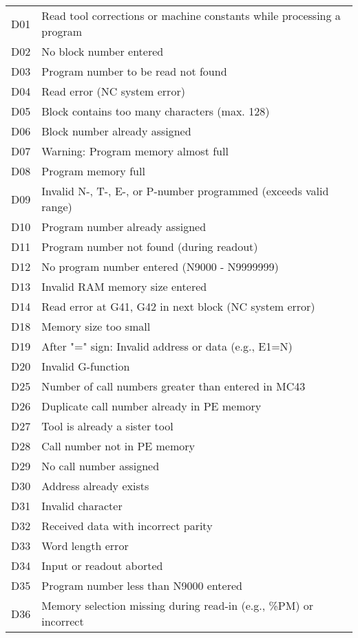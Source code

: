\documentclass[openany,11pt]{book}
\begin{document}
\begin{table}[!h]
    \begin{tabular}{ll}
    D01 & Read tool corrections or machine constants while processing a program \\
    D02 & No block number entered \\
    D03 & Program number to be read not found \\
    D04 & Read error (NC system error) \\
    D05 & Block contains too many characters (max. 128) \\
    D06 & Block number already assigned \\
    D07 & Warning: Program memory almost full \\
    D08 & Program memory full \\
    D09 & Invalid N-, T-, E-, or P-number programmed (exceeds valid range) \\
    D10 & Program number already assigned \\
    D11 & Program number not found (during readout) \\
    D12 & No program number entered (N9000 - N9999999) \\
    D13 & Invalid RAM memory size entered \\
    D14 & Read error at G41, G42 in next block (NC system error) \\
    D18 & Memory size too small \\
    D19 & After "=" sign: Invalid address or data (e.g., E1=N) \\
    D20 & Invalid G-function \\
    D25 & Number of call numbers greater than entered in MC43 \\
    D26 & Duplicate call number already in PE memory \\
    D27 & Tool is already a sister tool \\
    D28 & Call number not in PE memory \\
    D29 & No call number assigned \\
    D30 & Address already exists \\
    D31 & Invalid character \\
    D32 & Received data with incorrect parity \\
    D33 & Word length error \\
    D34 & Input or readout aborted \\
    D35 & Program number less than N9000 entered \\
    D36 & Memory selection missing during read-in (e.g., \%PM) or incorrect \\

\end{tabular}
\end{table}
\end{document}

